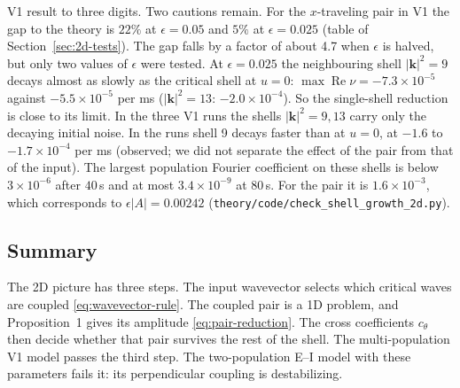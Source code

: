 \documentclass[11pt]{article}
\DeclareMathOperator{\RePart}{Re}
\begin{document}
V1 result to three digits. Two cautions remain. For the $x$-traveling pair in
V1 the gap to the theory is $22\%$ at $\epsilon=0.05$ and $5\%$ at
$\epsilon=0.025$ (table of Section~\ref{sec:2d-tests}). The gap falls by a
factor of about 4.7 when $\epsilon$ is halved, but only two values of
$\epsilon$ were tested. At $\epsilon=0.025$ the neighbouring shell
$|\boldsymbol k|^2=9$ decays almost as slowly as the critical shell at $u=0$:
$\max\RePart\nu=-7.3\times10^{-5}$ against $-5.5\times10^{-5}$ per ms
($|\boldsymbol k|^2=13$: $-2.0\times10^{-4}$). So the single-shell reduction is
close to its limit. In the three V1 runs the shells $|\boldsymbol k|^2=9,13$
carry only the decaying initial noise. In the runs shell 9 decays faster
than at $u=0$, at $-1.6$ to $-1.7\times10^{-4}$ per ms (observed; we did not
separate the effect of the pair from that of the input). The largest
population Fourier coefficient on these shells is below $3\times10^{-6}$ after
$40$\,s and at most $3.4\times10^{-9}$ at $80$\,s. For the pair it is
$1.6\times10^{-3}$, which corresponds to $\epsilon|A|=0.00242$
(\texttt{theory/code/check\_shell\_growth\_2d.py}).

\subsection{Summary}
The 2D picture has three steps. The input wavevector selects which critical
waves are coupled \eqref{eq:wavevector-rule}. The coupled pair is a 1D
problem, and Proposition~1 gives its amplitude \eqref{eq:pair-reduction}.
The cross coefficients $c_\theta$ then decide whether that pair survives the
rest of the shell. The multi-population V1 model passes the third step. The
two-population E--I model with these parameters fails it: its perpendicular
coupling is destabilizing.
\end{document}
